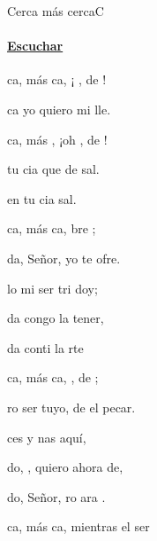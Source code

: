 \documentclass[12pt, spanish]{book}
\newcommand{\NotCCLIed}{\relax}
\begin{document}
    \begin{song}{Cerca más cerca}{C}
        {} %
        {}
        {} %
        {} %
        \ifChordBk
        \paragraph{\mbox{}\hfill\protect\href{https://open.spotify.com/intl-es/track/7pJwcnayZwrTQAiejrMHDp}{Escuchar}\mbox{}\hfill}
        \fi

        \begin{SBOpGroup}
            ca, más ca, ¡ , de !

            ca yo quiero mi  lle.

            ca, más , ¡oh , de !

              tu cia que de sal.

             en tu cia   sal.
        \end{SBOpGroup}
        \vskip 20pt
        \begin{SBOpGroup}
            ca, más ca,  bre ;

            da, Señor, yo te  ofre.

            lo mi ser tri  doy;

            da congo la  tener,

            da conti la  rte
        \end{SBOpGroup}
        \vskip 20pt
        \begin{SBOpGroup}
            ca, más ca, , de ;

            ro ser tuyo, de el pecar.

            ces y  nas aquí,

            do, , quiero ahora de,

            do, Señor, ro ara .
        \end{SBOpGroup}
        \vskip 20pt
        \begin{SBOpGroup}
            ca, más ca, mientras el ser


\end{SBOpGroup}
\end{song}
\end{document}
